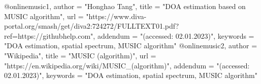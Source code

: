 @online{music1,
    author = "Honghao Tang",
    title = "DOA estimation based on MUSIC algorithm",
    url  = "https://www.diva-portal.org/smash/get/diva2:724272/FULLTEXT01.pdf?ref=https://githubhelp.com",
    addendum = "(accessed: 02.01.2023)",
    keywords = "DOA estimation, spatial spectrum, MUSIC algorithm"
}
@online{music2,
    author = "Wikipedia",
    title = "MUSIC (algorithm)",
    url = "https://en.wikipedia.org/wiki/MUSIC_(algorithm)",
    addendum = "(accessed: 02.01.2023)",
    keywords = "DOA estimation, spatial spectrum, MUSIC algorithm"
}
